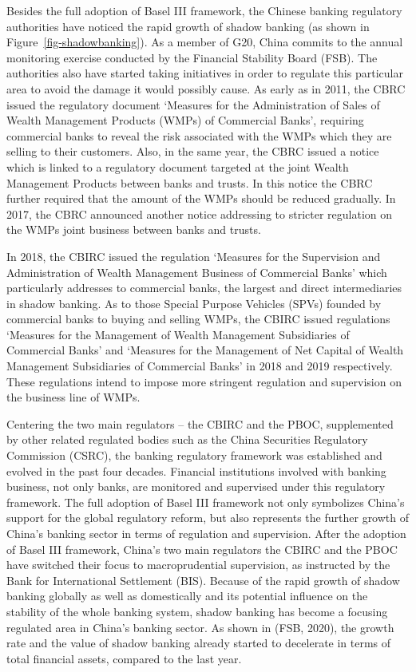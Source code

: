 \documentclass[
  letterpaper,
  DIV=11,
  numbers=noendperiod]{scrreprt}
\begin{document}
Besides the full adoption of Basel III framework, the Chinese banking
regulatory authorities have noticed the rapid growth of shadow banking
(as shown in Figure~\ref{fig-shadowbanking}). As a member of G20, China
commits to the annual monitoring exercise conducted by the Financial
Stability Board (FSB). The authorities also have started taking
initiatives in order to regulate this particular area to avoid the
damage it would possibly cause. As early as in 2011, the CBRC issued the
regulatory document `Measures for the Administration of Sales of Wealth
Management Products (WMPs) of Commercial Banks', requiring commercial
banks to reveal the risk associated with the WMPs which they are selling
to their customers. Also, in the same year, the CBRC issued a notice
which is linked to a regulatory document targeted at the joint Wealth
Management Products between banks and trusts. In this notice the CBRC
further required that the amount of the WMPs should be reduced
gradually. In 2017, the CBRC announced another notice addressing to
stricter regulation on the WMPs joint business between banks and trusts.

In 2018, the CBIRC issued the regulation `Measures for the Supervision
and Administration of Wealth Management Business of Commercial Banks'
which particularly addresses to commercial banks, the largest and direct
intermediaries in shadow banking. As to those Special Purpose Vehicles
(SPVs) founded by commercial banks to buying and selling WMPs, the CBIRC
issued regulations `Measures for the Management of Wealth Management
Subsidiaries of Commercial Banks' and `Measures for the Management of
Net Capital of Wealth Management Subsidiaries of Commercial Banks' in
2018 and 2019 respectively. These regulations intend to impose more
stringent regulation and supervision on the business line of WMPs.

Centering the two main regulators -- the CBIRC and the PBOC,
supplemented by other related regulated bodies such as the China
Securities Regulatory Commission (CSRC), the banking regulatory
framework was established and evolved in the past four decades.
Financial institutions involved with banking business, not only banks,
are monitored and supervised under this regulatory framework. The full
adoption of Basel III framework not only symbolizes China's support for
the global regulatory reform, but also represents the further growth of
China's banking sector in terms of regulation and supervision. After the
adoption of Basel III framework, China's two main regulators the CBIRC
and the PBOC have switched their focus to macroprudential supervision,
as instructed by the Bank for International Settlement (BIS). Because of
the rapid growth of shadow banking globally as well as domestically and
its potential influence on the stability of the whole banking system,
shadow banking has become a focusing regulated area in China's banking
sector. As shown in (FSB, 2020), the growth rate and the value of shadow
banking already started to decelerate in terms of total financial
assets, compared to the last year.
\end{document}
